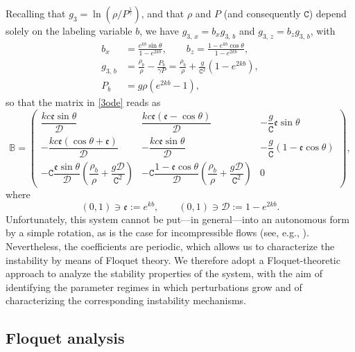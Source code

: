 \documentclass[reqno]{amsart}
\newcommand{\cs}{\texttt{C}}
\newcommand{\D}{\mathcal{D}}
\newcommand{\ee}{\mathfrak{e}}
\begin{document}
Recalling that $g_3 = \ln\left({\rho}/{P^{\frac{1}{\gamma}}}\right)$, and that $\rho$ and $P$ (and consequently $\cs$) depend solely on the labeling variable $b$, we have $g_{3,\,x}=b_x  g_{3,\,b}$ and $g_{3,\,z}=b_z  g_{3,\,b}$, with
\begin{equation}
\begin{aligned}
    b_x&=\frac{e^{kb}\sin\theta}{1-e^{2kb}}, \qquad b_z=\frac{1-e^{kb}\cos\theta}{1-e^{2kb}},\\
     g_{3,\,b}&=\frac{\rho_b}{\rho}-\frac{P_b}{\gamma P}=\frac{\rho_b}{\rho}+\frac{g}{\cs^2}(1-e^{2kb}),\\
P_b&=g\rho(e^{2kb}-1),
\end{aligned}
\end{equation}
so that the matrix in \eqref{3ode} reads as
\begin{equation}\label{B matrix}
  \mathbb{B}=  \begin{pmatrix}
\dfrac{kc\ee\sin\theta}{\D}
&
\dfrac{kc\ee(\ee-\cos\theta)}{\D}
&
-\dfrac{g}{\cs}{\ee\sin\theta}
\\[1.2em]
-\dfrac{kc \ee(\cos\theta+\ee)}{\D}
&
-\dfrac{kc\ee\sin\theta}{\D}
&
-\dfrac{g}{\cs}({1-\ee\cos\theta})
\\[1.2em]
-\cs\dfrac{\ee\sin\theta}{\D}\left(\dfrac{\rho_b}{\rho}+\dfrac{g\D}{\cs^2}\right)
&
-\cs \dfrac{1-\ee\cos\theta}{\D}\left(\dfrac{\rho_b}{\rho}+\dfrac{g\D}{\cs^2}\right)
&
0
\end{pmatrix},
\end{equation}
where
\begin{equation}
    (0,1)\ni\ee:=e^{kb}, \qquad (0,1)\ni\D:=1-e^{2kb}.
\end{equation}
Unfortunately, this system cannot be put---in general---into an autonomous form by a simple rotation, as is the case for incompressible flows (see, e.g., \cite{CG, Kruse, Kruse2, mioInstability}). Nevertheless, the coefficients are periodic, which allows us to characterize the instability by means of Floquet theory. We therefore adopt a Floquet-theoretic approach to analyze the stability properties of the system, with the aim of identifying the parameter regimes in which perturbations grow and of characterizing the corresponding instability mechanisms.



\subsection{Floquet analysis}\label{sec:floquet}
\end{document}
